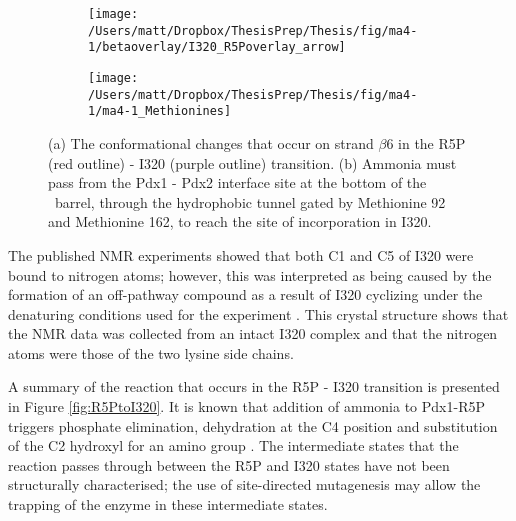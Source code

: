 \begin{figure}[!htbp]
\centering
\begin{subfigure}{.49\textwidth}
  \centering
  \texttt{[image: /Users/matt/Dropbox/ThesisPrep/Thesis/fig/ma4-1/betaoverlay/I320\_R5Poverlay\_arrow]}
  \caption{\label{fig:I320_Beta6}}
\end{subfigure}
\begin{subfigure}{.49\textwidth}
  \centering
  \texttt{[image: /Users/matt/Dropbox/ThesisPrep/Thesis/fig/ma4-1/ma4-1\_Methionines]}
  \caption{\label{fig:I320_Met}}
\end{subfigure}
\caption[Conformational changes facilitating the R5P - I320 Transition]{(a) The conformational changes that occur on strand $\beta$6 in the R5P (red outline) - I320 (purple outline) transition. (b) Ammonia must pass from the Pdx1 - Pdx2 interface site at the bottom of the \TIM ~barrel, through the hydrophobic tunnel gated by Methionine 92 and Methionine 162, to reach the site of incorporation in I320.}
\end{figure}  

The published NMR experiments showed that both C1 and C5 of I320 were bound to nitrogen atoms; however, this was interpreted as being caused by the formation of an off-pathway compound as a result of I320 cyclizing under the denaturing conditions used for the experiment \cite{Hanes2008b}. This crystal structure shows that the NMR data was collected from an intact I320 complex and that the nitrogen atoms were those of the two lysine side chains.      

A summary of the reaction that occurs in the R5P - I320 transition is presented in Figure \ref{fig:R5PtoI320}. It is known that addition of ammonia to Pdx1-R5P triggers phosphate elimination, dehydration at the C4 position and substitution of the C2 hydroxyl for an amino group \cite{Hanes2008a,Hanes2008b}. The intermediate states that the reaction passes through between the R5P and I320 states have not been structurally characterised; the use of site-directed mutagenesis may allow the trapping of the enzyme in these intermediate states.       


